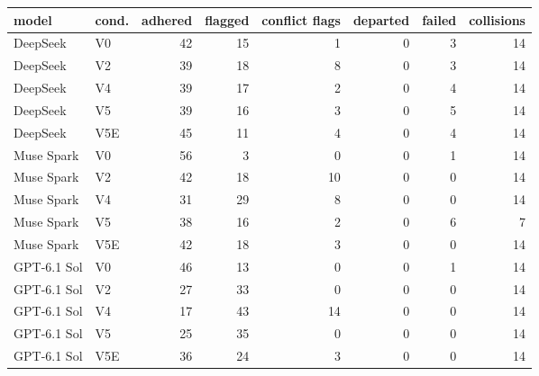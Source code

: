 \begin{tabular}{llrrrrrr}
\toprule
model & cond. & adhered & flagged & conflict flags & departed & failed & collisions \\
\midrule
DeepSeek & V0 & 42 & 15 & 1 & 0 & 3 & 14 \\
DeepSeek & V2 & 39 & 18 & 8 & 0 & 3 & 14 \\
DeepSeek & V4 & 39 & 17 & 2 & 0 & 4 & 14 \\
DeepSeek & V5 & 39 & 16 & 3 & 0 & 5 & 14 \\
DeepSeek & V5E & 45 & 11 & 4 & 0 & 4 & 14 \\
Muse Spark & V0 & 56 & 3 & 0 & 0 & 1 & 14 \\
Muse Spark & V2 & 42 & 18 & 10 & 0 & 0 & 14 \\
Muse Spark & V4 & 31 & 29 & 8 & 0 & 0 & 14 \\
Muse Spark & V5 & 38 & 16 & 2 & 0 & 6 & 7 \\
Muse Spark & V5E & 42 & 18 & 3 & 0 & 0 & 14 \\
GPT-6.1 Sol & V0 & 46 & 13 & 0 & 0 & 1 & 14 \\
GPT-6.1 Sol & V2 & 27 & 33 & 0 & 0 & 0 & 14 \\
GPT-6.1 Sol & V4 & 17 & 43 & 14 & 0 & 0 & 14 \\
GPT-6.1 Sol & V5 & 25 & 35 & 0 & 0 & 0 & 14 \\
GPT-6.1 Sol & V5E & 36 & 24 & 3 & 0 & 0 & 14 \\
\bottomrule
\end{tabular}
